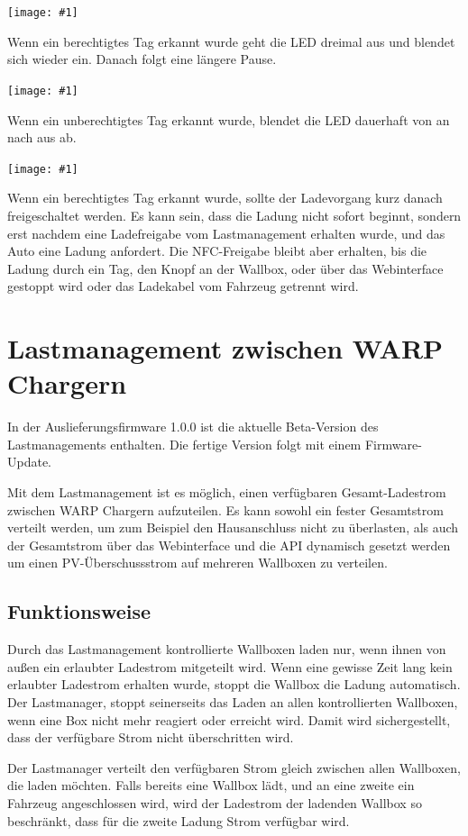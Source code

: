 \documentclass[a4paper,10pt]{article}
\newcommand{\hint}[1]{\begin{tcolorbox}[colback=boxgray,colframe=black,coltext=
white,title=Hinweis]#1\end{tcolorbox}}
\newcommand{\gfx}[1]{\texttt{[image: \#1]}}
\begin{document}
\begin{multicols*}{2}
	\gfx{./img_warp2/resized/blink_nag}

	Wenn ein berechtigtes Tag erkannt wurde geht die LED 
	dreimal aus und blendet sich wieder ein. Danach folgt eine längere Pause.

	\gfx{./img_warp2/resized/blink_ack}

	Wenn ein unberechtigtes Tag erkannt wurde, blendet die LED dauerhaft von an nach aus ab.

	\gfx{./img_warp2/resized/blink_nack}

	Wenn ein berechtigtes Tag erkannt wurde, sollte der Ladevorgang kurz danach
	freigeschaltet werden. Es kann sein, dass die Ladung nicht
	sofort beginnt, sondern erst nachdem eine Ladefreigabe vom Lastmanagement erhalten wurde,
	und das Auto eine Ladung anfordert. Die NFC-Freigabe bleibt aber erhalten,
	bis die Ladung durch ein Tag, den Knopf an der Wallbox, oder über das Webinterface gestoppt wird
	oder das Ladekabel vom Fahrzeug getrennt wird.

	\newpage
	\section{Lastmanagement zwischen WARP Chargern}\label{charge_manager}
	\hint{In der Auslieferungsfirmware 1.0.0 ist die aktuelle Beta-Version des Lastmanagements enthalten.
	Die fertige Version folgt mit einem Firmware-Update.}
	Mit dem Lastmanagement ist es möglich, einen verfügbaren Gesamt-Ladestrom zwischen WARP Chargern aufzuteilen.
	Es kann sowohl ein fester Gesamtstrom verteilt werden, um zum Beispiel den Hausanschluss nicht zu überlasten,
	als auch der Gesamtstrom über das Webinterface und die API dynamisch gesetzt werden
	um einen PV-Überschussstrom auf mehreren Wallboxen zu verteilen.

	\subsection{Funktionsweise}
	Durch das Lastmanagement kontrollierte Wallboxen laden nur,
	wenn ihnen von außen ein erlaubter Ladestrom mitgeteilt wird. Wenn eine gewisse Zeit lang
	kein erlaubter Ladestrom erhalten wurde, stoppt die Wallbox die Ladung automatisch.
	Der Lastmanager, stoppt seinerseits das Laden an allen kontrollierten Wallboxen,
	wenn eine Box nicht mehr reagiert oder erreicht wird. Damit wird sichergestellt,
	dass der verfügbare Strom nicht überschritten wird.

	Der Lastmanager verteilt den verfügbaren Strom gleich zwischen allen Wallboxen, die laden möchten.
	Falls bereits eine Wallbox lädt, und an eine zweite ein Fahrzeug angeschlossen wird,
	wird der Ladestrom der ladenden Wallbox so beschränkt, dass für die zweite Ladung Strom verfügbar wird.


\end{multicols*}
\end{document}
